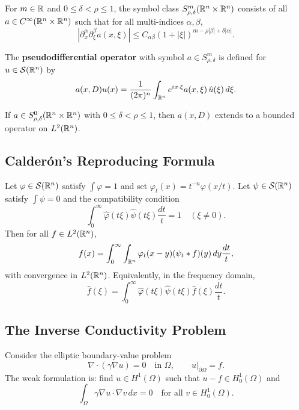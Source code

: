 \begin{definition}
For $m \in \mathbb{R}$ and $0 \leq \delta < \rho \leq 1$, the symbol class $S^m_{\rho,\delta}(\mathbb{R}^n \times \mathbb{R}^n)$ consists of all $a \in C^\infty(\mathbb{R}^n \times \mathbb{R}^n)$ such that for all multi-indices $\alpha, \beta$,
\[
|\partial_x^\alpha \partial_\xi^\beta a(x,\xi)| \leq C_{\alpha\beta} (1+|\xi|)^{m - \rho|\beta| + \delta|\alpha|}.
\]
\end{definition}

\begin{definition}
The \textbf{pseudodifferential operator} with symbol $a \in S^m_{\rho,\delta}$ is defined for $u \in \mathcal{S}(\mathbb{R}^n)$ by
\[
a(x,D) u(x) = \frac{1}{(2\pi)^n} \int_{\mathbb{R}^n} e^{i x \cdot \xi} a(x,\xi) \, \hat u(\xi) \,d\xi.
\]
\end{definition}

\begin{theorem}
If $a \in S^0_{\rho,\delta}(\mathbb{R}^n \times \mathbb{R}^n)$ with $0 \leq \delta < \rho \leq 1$, then $a(x,D)$ extends to a bounded operator on $L^2(\mathbb{R}^n)$.
\end{theorem}

\subsection{Calder\'{o}n's Reproducing Formula}

\begin{theorem}
Let $\varphi \in \mathcal{S}(\mathbb{R}^n)$ satisfy $\int \varphi = 1$ and set $\varphi_t(x) = t^{-n} \varphi(x/t)$. Let $\psi \in \mathcal{S}(\mathbb{R}^n)$ satisfy $\int \psi = 0$ and the compatibility condition
\[
\int_0^\infty \hat\varphi(t\xi) \hat\psi(t\xi) \frac{dt}{t} = 1 \quad (\xi \neq 0).
\]
Then for all $f \in L^2(\mathbb{R}^n)$,
\[
f(x) = \int_0^\infty \int_{\mathbb{R}^n} \varphi_t(x-y) (\psi_t * f)(y) \,dy \frac{dt}{t},
\]
with convergence in $L^2(\mathbb{R}^n)$. Equivalently, in the frequency domain,
\[
\hat f(\xi) = \int_0^\infty \hat\varphi(t\xi) \hat\psi(t\xi) \hat f(\xi) \frac{dt}{t}.
\]
\end{theorem}

\subsection{The Inverse Conductivity Problem}

Consider the elliptic boundary-value problem
\[
\nabla \cdot (\gamma \nabla u) = 0 \quad \text{in } \Omega, \qquad u|_{\partial\Omega} = f.
\]
The weak formulation is: find $u \in H^1(\Omega)$ such that $u - f \in H_0^1(\Omega)$ and
\[
\int_\Omega \gamma \nabla u \cdot \nabla v \,dx = 0 \quad \text{for all } v \in H_0^1(\Omega).
\]

